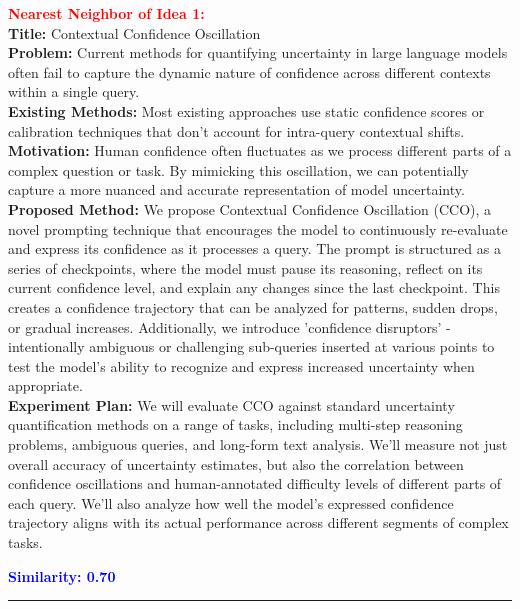\textbf{\textcolor{red}{Nearest Neighbor of Idea 1:}} \\
\textbf{Title:} Contextual Confidence Oscillation \\
\textbf{Problem:}  Current methods for quantifying uncertainty in large language models often fail to capture the dynamic nature of confidence across different contexts within a single query. \\
\textbf{Existing Methods:} Most existing approaches use static confidence scores or calibration techniques that don't account for intra-query contextual shifts. \\
\textbf{Motivation:} Human confidence often fluctuates as we process different parts of a complex question or task. By mimicking this oscillation, we can potentially capture a more nuanced and accurate representation of model uncertainty. \\
\textbf{Proposed Method:} We propose Contextual Confidence Oscillation (CCO), a novel prompting technique that encourages the model to continuously re-evaluate and express its confidence as it processes a query. The prompt is structured as a series of checkpoints, where the model must pause its reasoning, reflect on its current confidence level, and explain any changes since the last checkpoint. This creates a confidence trajectory that can be analyzed for patterns, sudden drops, or gradual increases. Additionally, we introduce 'confidence disruptors' - intentionally ambiguous or challenging sub-queries inserted at various points to test the model's ability to recognize and express increased uncertainty when appropriate. \\
\textbf{Experiment Plan:} We will evaluate CCO against standard uncertainty quantification methods on a range of tasks, including multi-step reasoning problems, ambiguous queries, and long-form text analysis. We'll measure not just overall accuracy of uncertainty estimates, but also the correlation between confidence oscillations and human-annotated difficulty levels of different parts of each query. We'll also analyze how well the model's expressed confidence trajectory aligns with its actual performance across different segments of complex tasks.

\vspace{0.5em}

\noindent\textbf{\textcolor{blue}{Similarity: 0.70}} \\

\hrule

\vspace{1em}

